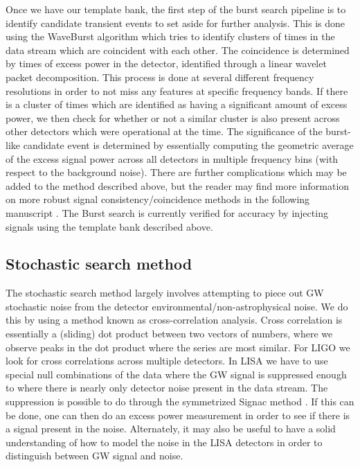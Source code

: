 %
%

Once we have our template bank, the first step of the burst search pipeline is to identify candidate transient events to set aside for further analysis. This is done using the WaveBurst algorithm which tries to identify clusters of times in the data stream which are coincident with each other. The coincidence is determined by times of excess power in the detector, identified through a linear wavelet packet decomposition. This process is done at several different frequency resolutions in order to not miss any features at specific frequency bands. If there is a cluster of times which are identified as having a significant amount of excess power, we then check for whether or not a similar cluster is also present across other detectors which were operational at the time. The significance of the burst-like candidate event is determined by essentially computing the geometric average of the excess signal power across all detectors in multiple frequency bins (with respect to the background noise). There are further complications which may be added to the method described above, but the reader may find more information on more robust signal consistency/coincidence methods in the following manuscript \cite{Abbott_2007}. The Burst search is currently verified for accuracy by injecting signals using the template bank described above.

\subsection{Stochastic search method}

%
The stochastic search method largely involves attempting to piece out \ac{GW} stochastic noise from the detector environmental/non-astrophysical noise. We do this by using a method known as cross-correlation analysis. Cross correlation is essentially a (sliding) dot product between two vectors of numbers, where we observe peaks in the dot product where the series are most similar. For \ac{LIGO} we look for cross correlations across multiple detectors. In \ac{LISA} we have to use special null combinations of the data where the \ac{GW} signal is suppressed enough to where there is nearly only detector noise present in the data stream. The suppression is possible to do through the symmetrized Signac method \cite{PhysRevD.64.062002}. If this can be done, one can then do an excess power measurement in order to see if there is a signal present in the noise. Alternately, it may also be useful to have a solid understanding of how to model the noise in the \ac{LISA} detectors in order to distinguish between \ac{GW} signal and noise. 

